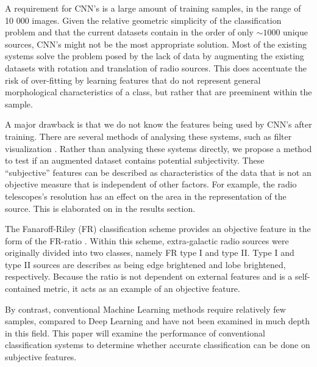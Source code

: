 \documentclass[conference]{IEEEtran}
\begin{document}
A requirement for CNN's is a large amount of training samples, in the range of 10 000 images. Given the relative geometric simplicity of the classification problem and that the current datasets contain in the order of only $\sim1000$ unique sources, CNN's might not be the most appropriate solution. 
Most of the existing systems solve the problem posed by the lack of data by augmenting the existing datasets with rotation and translation of radio sources. This does accentuate the risk of over-fitting by learning features that do not represent general morphological characteristics of a class, but rather that are preeminent within the sample.


A major drawback is that we do not know the features being used by CNN's after training. There are several methods of analysing these systems, such as filter visualization \cite{aniyan_thorat_2017}. Rather than analysing these systems directly, we propose a method to test if an augmented dataset contains potential subjectivity. These ``subjective'' features can be described as characteristics of the data that is not an objective measure that is independent of other factors. For example, the radio telescopes's resolution has an effect on the area in the representation of the source. This is elaborated on in the results section.

The Fanaroff-Riley (FR) classification scheme provides an objective feature in the form of the FR-ratio \cite{fanaroff_riley_1974}. Within this scheme, extra-galactic radio sources were originally divided into two classes, namely FR type I and type II. Type I and type II sources are describes as being edge brightened and lobe brightened, respectively. Because the ratio is not dependent on external features and is a self-contained metric, it acts as an example of an objective feature.

By contrast, conventional Machine Learning methods require relatively few samples, compared to Deep Learning and have not been examined in much depth in this field. This paper will examine the performance of conventional classification systems to determine whether accurate classification can be done on subjective features.


\end{document}
